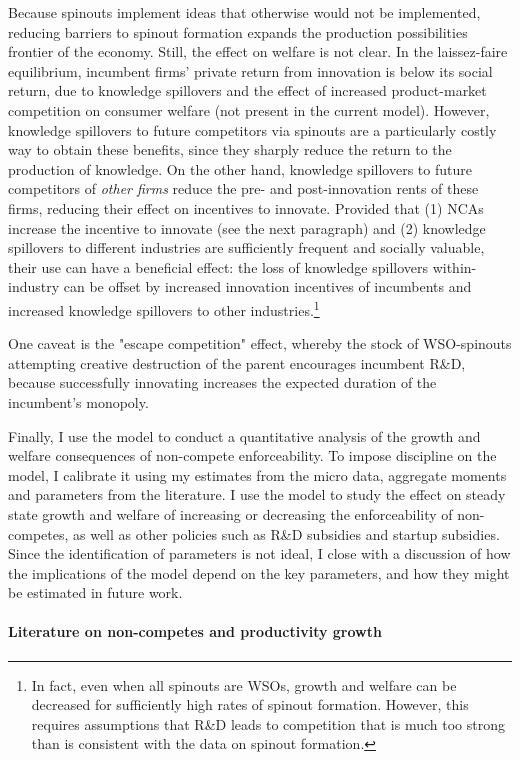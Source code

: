 \documentclass[12pt,english]{article}
\theoremstyle{remark}
\begin{document}
Because spinouts implement ideas that otherwise would not be implemented, reducing barriers to spinout formation expands the production possibilities frontier of the economy. Still, the effect on welfare is not clear. In the laissez-faire equilibrium, incumbent firms' private return from innovation is below its social return, due to knowledge spillovers and the effect of increased product-market competition on consumer welfare (not present in the current model). However, knowledge spillovers to future competitors via spinouts are a particularly costly way to obtain these benefits, since they sharply reduce the return to the production of knowledge. On the other hand, knowledge spillovers to future competitors of \textit{other firms} reduce the pre- and post-innovation rents of these firms, reducing their effect on incentives to innovate. Provided that (1) NCAs increase the incentive to innovate (see the next paragraph) and (2) knowledge spillovers to different industries are sufficiently frequent and socially valuable, their use can have a beneficial effect: the loss of knowledge spillovers within-industry can be offset by increased innovation incentives of incumbents and increased knowledge spillovers to other industries.\footnote{In fact, even when all spinouts are WSOs, growth and welfare can be decreased for sufficiently high rates of spinout formation. However, this requires assumptions that R\&D leads to competition that is much too strong than is consistent with the data on spinout formation.}

One caveat is the "escape competition" effect, whereby the stock of WSO-spinouts attempting creative destruction of the parent encourages incumbent R\&D, because successfully innovating increases the expected duration of the incumbent's monopoly.

Finally, I use the model to conduct a quantitative analysis of the growth and welfare consequences of non-compete enforceability. To impose discipline on the model, I calibrate it using my estimates from the micro data, aggregate moments and parameters from the literature. I use the model to study the effect on steady state growth and welfare of increasing or decreasing the enforceability of non-competes, as well as other policies such as R\&D subsidies and startup subsidies. Since the identification of parameters is not ideal, I close with a discussion of how the implications of the model depend on the key parameters, and how they might be estimated in future work. 

\paragraph{Literature on non-competes and productivity growth}
\end{document}
